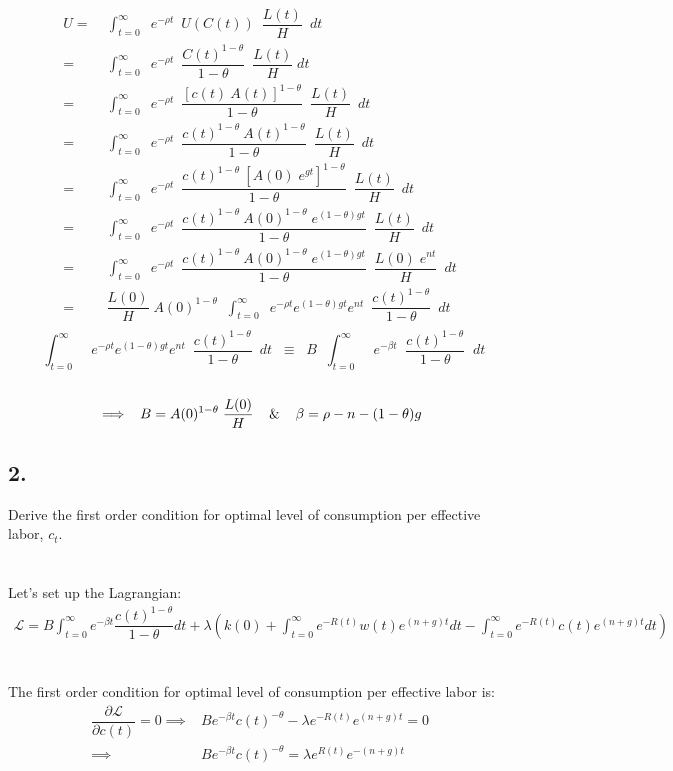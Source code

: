 \documentclass[12pt]{extarticle}
\def\secondarycolor{Golden}
\newcommand{\problem}[1]{
    \subsection*{\textcolor{\secondarycolor}{#1}}
    \addcontentsline{toc}{subsection}{\protect\numberline{}#1}
}
\begin{document}
\begin{align*}
    U=&\;\int_{t=0}^{\infty}\;\; e^{-\rho t}\;\:U(C(t))\;\:\dfrac{L(t)}{H}\;\:dt\\
    =&\;\int_{t=0}^{\infty}\;\; e^{-\rho t}\;\:\dfrac{C(t)^{1-\theta}}{1-\theta}\;\:\dfrac{L(t)}{H}\;dt\\
    =&\;\int_{t=0}^{\infty}\;\; e^{-\rho t}\;\:\dfrac{[c(t)\:A(t)]^{1-\theta}}{1-\theta}\;\:\dfrac{L(t)}{H}\;\:dt\\
    =&\;\int_{t=0}^{\infty}\;\; e^{-\rho t}\;\:\dfrac{c(t)^{1-\theta}\:A(t)^{1-\theta}}{1-\theta}\;\:\dfrac{L(t)}{H}\;\:dt\\
    =&\;\int_{t=0}^{\infty}\;\; e^{-\rho t}\;\:\dfrac{c(t)^{1-\theta}\:[A(0)\;e^{gt}]^{1-\theta}}{1-\theta}\;\:\dfrac{L(t)}{H}\;\:dt\\
    =&\;\int_{t=0}^{\infty}\;\; e^{-\rho t}\;\:\dfrac{c(t)^{1-\theta}\:A(0)^{1-\theta}\;e^{(1-\theta)gt}}{1-\theta}\;\:\dfrac{L(t)}{H}\;\:dt\\
    =&\;\int_{t=0}^{\infty}\;\; e^{-\rho t}\;\:\dfrac{c(t)^{1-\theta}\:A(0)^{1-\theta}\;e^{(1-\theta)gt}}{1-\theta}\;\:\dfrac{L(0)\;e^{nt}}{H}\;\:dt\\
    =&\;\dfrac{L(0)}{H}\;A(0)^{1-\theta}\;\;\int_{t=0}^{\infty}\;\; e^{-\rho t}e^{(1-\theta)gt}e^{nt}\;\:\dfrac{c(t)^{1-\theta}}{1-\theta}\;\:dt\\
\end{align*}
$$\;\;\int_{t=0}^{\infty}\;\; e^{-\rho t}e^{(1-\theta)gt}e^{nt}\;\:\dfrac{c(t)^{1-\theta}}{1-\theta}\;\:dt\;\;\equiv\;\;B\;\;\int_{t=0}^{\infty}\;\;e^{-\beta t}\;\;\dfrac{c(t)^{1-\theta}}{1-\theta}\;\;dt$$\\
$$\implies\;\;B=A(0)^{1-\theta}\;\dfrac{L(0)}{H}\;\;\And\;\;\beta=\rho-n-(1-\theta)g$$
\newpage
\problem{2.} Derive the first order condition for optimal
level of consumption per effective labor, $c_t$.\\\\\\
Let's set up the Lagrangian:\\
\begin{align*}
    \mathcal{L}= B \int_{t=0}^{\infty} e^{-\beta t} \dfrac{c(t)^{1-\theta}}{1-\theta} dt
    + \lambda \left( k(0) + \int_{t=0}^{\infty} e^{-R(t)}w(t)e^{(n+g)t} dt - \int_{t=0}^{\infty} e^{-R(t)}c(t)e^{(n+g)t} dt \right)
\end{align*}\\\\
The first order condition for optimal level of consumption per effective labor is:\\
\begin{align*}
    \dfrac{\partial \mathcal{L}}{\partial c(t)} = 0 \implies& B e^{-\beta t} c(t)^{-\theta} - \lambda e^{-R(t)}e^{(n+g)t} = 0\\
    \implies &B e^{-\beta t} c(t)^{-\theta} = \lambda e^{R(t)}e^{-(n+g)t}
\end{align*}
\end{document}
